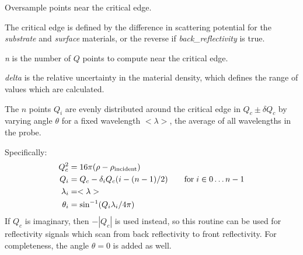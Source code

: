 \documentclass[letterpaper,10pt,english]{sphinxmanual}
\begin{document}
\begin{fulllineitems}

\begin{fulllineitems}
\label{api/probe:refl1d.probe.ProbeSet.calc_Q}
\end{fulllineitems}


\begin{fulllineitems}
\label{api/probe:refl1d.probe.ProbeSet.critical_edge}
Oversample points near the critical edge.

The critical edge is defined by the difference in scattering
potential for the \emph{substrate} and \emph{surface} materials, or the
reverse if \emph{back\_reflectivity} is true.

\emph{n} is the number of $Q$ points to compute near the critical edge.

\emph{delta} is the relative uncertainty in the material density,
which defines the range of values which are calculated.

The $n$ points $Q_i$ are evenly distributed around the critical
edge in $Q_c \pm \delta Q_c$ by varying angle $\theta$ for a
fixed wavelength $< \lambda >$, the average of all wavelengths
in the probe.

Specifically:
\begin{gather}
\begin{split}Q_c^2 &= 16 \pi (\rho - \rho_\text{incident}) \\
Q_i &= Q_c - \delta_i Q_c (i - (n-1)/2)
    \qquad \text{for} \; i \in 0 \ldots n-1 \\
\lambda_i &= < \lambda > \\
\theta_i &= \sin^{-1}(Q_i \lambda_i / 4 \pi)\end{split}\notag
\end{gather}
If $Q_c$ is imaginary, then $-|Q_c|$ is used instead, so this
routine can be used for reflectivity signals which scan from
back reflectivity to front reflectivity.  For completeness,
the angle $\theta = 0$ is added as well.

\end{fulllineitems}


\begin{fulllineitems}
\label{api/probe:refl1d.probe.ProbeSet.data}
\end{fulllineitems}


\end{fulllineitems}
\end{document}

